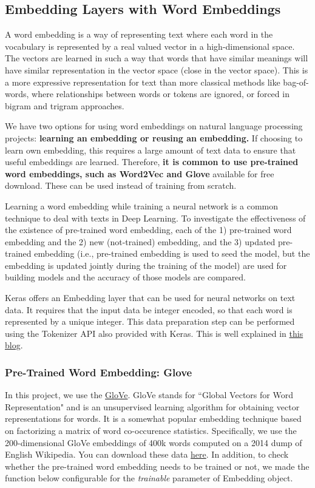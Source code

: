 \documentclass[11pt]{article}
\begin{document}
\subsection{Embedding Layers with Word Embeddings}

A word embedding is a way of representing text where each word in the vocabulary is represented by a real valued vector in a high-dimensional space. The vectors are learned in such a way that words that have similar meanings will have similar representation in the vector space (close in the vector space). This is a more expressive representation for text than more classical methods like bag-of-words, where relationships between words or tokens are ignored, or forced in bigram and trigram approaches.

We have two options for using word embeddings on natural language processing projects: \textbf{learning an embedding or reusing an embedding.}
%
If choosing to learn own embedding, this requires a large amount of text data to ensure that useful embeddings are learned. Therefore, \textbf{it is common to use pre-trained word embeddings, such as Word2Vec and Glove} available for free download.
%
These can be used instead of training from scratch.

Learning a word embedding while training a neural network is a common technique to deal with texts in Deep Learning.
%
To investigate the effectiveness of the existence of pre-trained word embedding,
each of the 1) pre-trained word embedding and the 2) new (not-trained) embedding, and the
3) updated pre-trained embedding (i.e., pre-trained embedding is used to seed the model, but the embedding is updated jointly during the training of the model) are used for building models and the accuracy of those models are compared.

Keras offers an Embedding layer that can be used for neural networks on text data.
%
It requires that the input data be integer encoded, so that each word is represented by a unique integer. This data preparation step can be performed using the Tokenizer API also provided with Keras.
%
This is well explained in \href{https://blog.keras.io/using-pre-trained-word-embeddings-in-a-keras-model.html}{this blog}.

\subsubsection{Pre-Trained Word Embedding: Glove}

In this project, we use the \href{https://nlp.stanford.edu/projects/glove/}{GloVe}. GloVe stands for ``Global Vectors for Word Representation" and is an unsupervised learning algorithm for obtaining vector representations for words.
It is a somewhat popular embedding technique based on factorizing a matrix of word co-occurence statistics.
%
Specifically, we use the 200-dimensional GloVe embeddings of 400k words computed on a 2014 dump of English Wikipedia. You can download these data \href{http://nlp.stanford.edu/data/glove.6B.zip}{here}.
%
In addition, to check whether the pre-trained word embedding needs to be trained or not, we made the function below configurable for the \textit{trainable} parameter of Embedding object.
\end{document}
